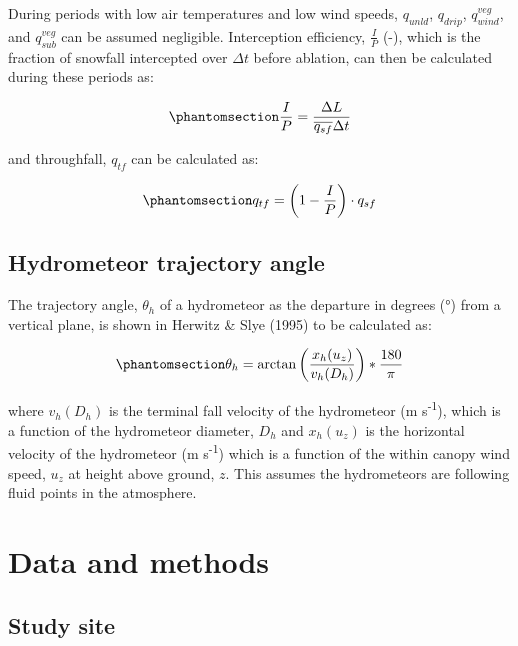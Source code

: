 \documentclass[
  letterpaper,
  DIV=11,
  numbers=noendperiod]{scrartcl}
\begin{document}
During periods with low air temperatures and low wind speeds,
\(q_{unld}\), \(q_{drip}\), \(q_{wind}^{veg}\), and \(q_{sub}^{veg}\)
can be assumed negligible. Interception efficiency, \(\frac{I}{P}\) (-),
which is the fraction of snowfall intercepted over \(\Delta t\) before
ablation, can then be calculated during these periods as:

\begin{equation}\phantomsection\label{eq-ip}{
\frac{I}{P} = \frac{\Delta L}{\overline{q_{sf}} \Delta t}
}\end{equation}

and throughfall, \(q_{tf}\) can be calculated as:

\begin{equation}\phantomsection\label{eq-event-tf}{
q_{tf} = \left(1 - \frac{I}{P} \right) \cdot q_{sf}
}\end{equation}

\subsection{Hydrometeor trajectory
angle}\label{hydrometeor-trajectory-angle}

The trajectory angle, \(\theta_h\) of a hydrometeor as the departure in
degrees (°) from a vertical plane, is shown in Herwitz \& Slye (1995) to
be calculated as:

\begin{equation}\phantomsection\label{eq-ta}{
\theta_h = \arctan \left(\frac{x_h(u_z)}{v_h(D_h)}\right)*\frac{180}{\pi}
}\end{equation}

where \(v_h(D_h)\) is the terminal fall velocity of the hydrometeor (m
s\textsuperscript{-1}), which is a function of the hydrometeor diameter,
\(D_h\) and \(x_h(u_z)\) is the horizontal velocity of the hydrometeor
(m s\textsuperscript{-1}) which is a function of the within canopy wind
speed, \(u_z\) at height above ground, \(z\). This assumes the
hydrometeors are following fluid points in the atmosphere.

\section{Data and methods}\label{data-and-methods}

\subsection{Study site}\label{study-site}
\end{document}
